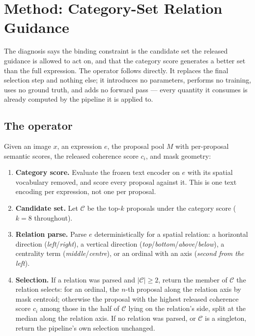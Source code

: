 \section{Method: Category-Set Relation Guidance}
\label{sec:method}

The diagnosis says the binding constraint is the candidate set the released
guidance is allowed to act on, and that the category score generates a better
set than the full expression. The operator follows directly. It replaces the
final selection step and nothing else; it introduces no parameters, performs no
training, uses no ground truth, and adds no forward pass --- every quantity it
consumes is already computed by the pipeline it is applied to.

\subsection{The operator}

Given an image $x$, an expression $e$, the proposal pool $M$ with per-proposal
semantic scores, the released coherence score $c_i$, and mask geometry:

\begin{enumerate}
\item \textbf{Category score.} Evaluate the frozen text encoder on $e$ with its
spatial vocabulary removed, and score every proposal against it. This is one
text encoding per expression, not one per proposal.
\item \textbf{Candidate set.} Let $\mathcal{C}$ be the top-$k$ proposals under
the category score ($k=8$ throughout).
\item \textbf{Relation parse.} Parse $e$ deterministically for a spatial
relation: a horizontal direction (\emph{left}/\emph{right}), a vertical
direction (\emph{top}/\emph{bottom}/\emph{above}/\emph{below}), a centrality
term (\emph{middle}/\emph{centre}), or an ordinal with an axis (\emph{second
from the left}).
\item \textbf{Selection.} If a relation was parsed and $|\mathcal{C}|\ge 2$,
return the member of $\mathcal{C}$ the relation selects: for an ordinal, the
$n$-th proposal along the relation axis by mask centroid; otherwise the
proposal with the highest released coherence score $c_i$ among those in the
half of $\mathcal{C}$ lying on the relation's side, split at the median along
the relation axis. If no relation was parsed, or $\mathcal{C}$ is a singleton,
return the pipeline's own selection unchanged.
\end{enumerate}

